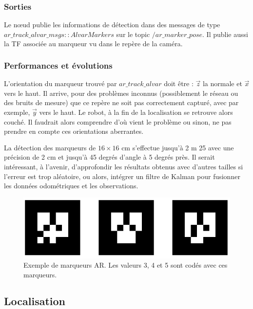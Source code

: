 \documentclass[10pt,a4paper]{article}
\begin{document}
\subsubsection{Sorties}

Le nœud publie les informations de détection dans des messages de type $ar\_track\_alvar\_msgs::AlvarMarkers$ sur le topic $/ar\_marker\_pose$. Il publie aussi la TF associée au marqueur vu dans le repère de la caméra.
	
\subsubsection{Performances et évolutions}

L'orientation du marqueur trouvé par $ar\_track\_alvar$ doit être : $\vec{z}$ la normale et $\vec{x}$ vers le haut. Il arrive, pour des problèmes inconnus (possiblement le réseau ou des bruits de mesure) que ce repère ne soit pas correctement capturé, avec par exemple, $\vec{y}$ vers le haut. Le robot, à la fin de la localisation se retrouve alors couché. Il faudrait alors comprendre d'où vient le problème ou sinon, ne pas prendre en compte ces orientations aberrantes. 
	
La détection des marqueurs de $16 \times 16$ cm s'effectue jusqu'à 2 m 25 avec une précision de 2 cm et jusqu'à 45 degrés d'angle à 5 degrés près. Il serait intéressant, à l'avenir, d'approfondir les résultats obtenus avec d'autres tailles si l'erreur est trop aléatoire, ou alors, intégrer un filtre de Kalman pour fusionner les données odométriques et les observations.

\begin{figure}
\center
\includegraphics[scale=0.6]{figures/artags.png} 
\caption{Exemple de marqueurs AR. Les valeurs 3, 4 et 5 sont codés avec ces marqueurs.}	
\end{figure}


\subsection{Localisation}
\label{sec:localision}
\end{document}
